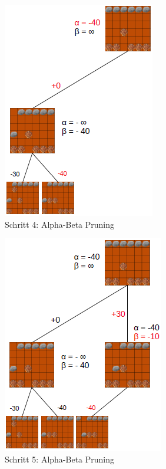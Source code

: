 \begin{figure}[h]
	\centering
	\includegraphics{img/ab4}
	\caption{Schritt 4: Alpha-Beta Pruning}
	\label{fig:ab4}
\end{figure}

\begin{figure}[h]
	\centering
	\includegraphics{img/ab5}
	\caption{Schritt 5: Alpha-Beta Pruning}
	\label{fig:ab5}
\end{figure}

